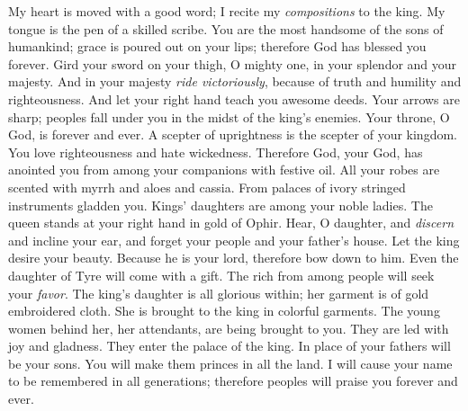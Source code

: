 \begin{biblechapter} %
 My heart is moved with a good word; 
I recite my \textit{compositions} to the king. 
My tongue is the pen of a skilled scribe.
\verse You are the most handsome of the sons of humankind; 
grace is poured out on your lips; 
therefore God has blessed you forever.
\verse Gird your sword on your thigh, O mighty one, 
in your splendor and your majesty.
\verse And in your majesty \textit{ride victoriously}, 
because of truth and humility and righteousness. 
And let your right hand teach you awesome deeds.
\verse Your arrows are sharp; 
peoples fall under you 
in the midst of the king’s enemies.
\verse Your throne, O God, is forever and ever. 
A scepter of uprightness is 
the scepter of your kingdom.
\verse You love righteousness and hate wickedness. 
Therefore God, your God, has anointed you 
from among your companions with festive oil.
\verse All your robes are scented with myrrh and aloes and cassia. 
From palaces of ivory stringed instruments gladden you.
\verse Kings’ daughters are among your noble ladies. 
The queen stands at your right hand in gold of Ophir.
\verse Hear, O daughter, and \textit{discern} and incline your ear, 
and forget your people and your father’s house.
\verse Let the king desire your beauty. 
Because he is your lord, therefore bow down to him.
\verse Even the daughter of Tyre will come with a gift. 
The rich from among people will seek your \textit{favor}.
\verse The king’s daughter is all glorious within; 
her garment is of gold embroidered cloth.
\verse She is brought to the king in colorful garments. 
The young women behind her, her attendants, 
are being brought to you.
\verse They are led with joy and gladness. 
They enter the palace of the king.
\verse In place of your fathers will be your sons. 
You will make them princes in all the land.
\verse I will cause your name to be remembered in all generations; 
therefore peoples will praise you forever and ever.
\end{biblechapter}

